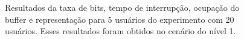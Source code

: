 \begin{figure}
    \captionsetup{justification=centering}
    \centering
    \caption{Resultados da taxa de bits, tempo de interrupção, ocupação do buffer e representação para 5 usuários do experimento com 20 usuários. Esses resultados foram obtidos no cenário do nível 1.}
    \label{fig:user-lvl1}
\end{figure}




